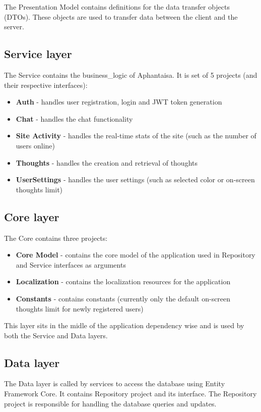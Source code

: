 The Presentation Model contains definitions for the data transfer objects (DTOs).
These objects are used to transfer data between the client and the server.

\subsection*{Service layer}
The Service contains the \gls{business_logic} of Aphantaisa.
It is set of 5 projects (and their respective interfaces):
\begin{itemize}
    \item \textbf{Auth} - handles user registration, login and JWT token generation
    \item \textbf{Chat} - handles the chat functionality
    \item \textbf{Site Activity} - handles the real-time stats of the site (such as the number of users online)
    \item \textbf{Thoughts} - handles the creation and retrieval of thoughts
    \item \textbf{UserSettings} - handles the user settings (such as selected color or on-screen thoughts limit)
\end{itemize}

\subsection*{Core layer}
The Core contains three projects:
\begin{itemize}
    \item \textbf{Core Model} - contains the core model of the application used in Repository and Service interfaces as arguments
    \item \textbf{Localization} - contains the localization resources for the application
    \item \textbf{Constants} - contains constants (currently only the default on-screen thoughts limit for newly registered users)
\end{itemize}

This layer sits in the midle of the application dependency wise and is used by both the Service and Data layers.

\subsection*{Data layer}
The Data layer is called by services to access the database using Entity Framework Core.
It contains Repository project and its interface.
The Repository project is responsible for handling the database queries and updates.

